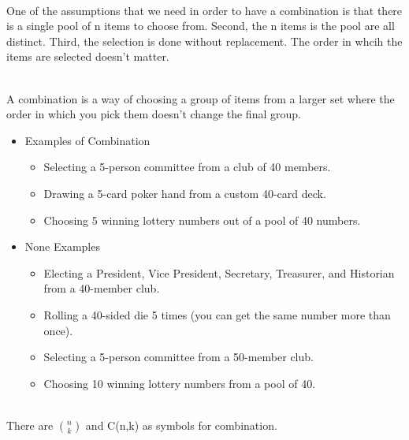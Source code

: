\documentclass[12pt]{article}
\begin{document}
\begin{enumerate}

\\One of the assumptions that we need in order to have a combination is that there is a single pool of n items to choose from. Second, the n items is the pool are all distinct. Third, the selection is done without replacement. The order in whcih the items are selected doesn't matter. 

\\A combination is a way of choosing a group of items from a larger set where the order in which you pick them doesn't change the final group. 

\begin{itemize}
    \item Examples of Combination 
    \begin{itemize}
        \item Selecting a 5-person committee from a club of 40 members. 
        \item Drawing a 5-card poker hand from a custom 40-card deck. 
        \item Choosing 5 winning lottery numbers out of a pool of 40 numbers. 
    \end{itemize}
    \item None Examples
    \begin{itemize}
        \item Electing a President, Vice President, Secretary, Treasurer, and Historian from a 40-member club.
        \item Rolling a 40-sided die 5 times (you can get the same number more than once).
        \item Selecting a 5-person committee from a 50-member club.
        \item Choosing 10 winning lottery numbers from a pool of 40.
    \end{itemize}
\end{itemize}


\\There are $\binom{n}{k}$ and C(n,k) as symbols for combination.  

\end{enumerate}
\newpage
{}
\end{document}
